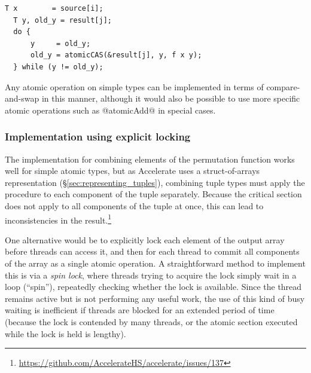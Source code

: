 \begin{lstlisting}[style=cuda]
  T x        = source[i];
  T y, old_y = result[j];
  do {
      y     = old_y;
      old_y = atomicCAS(&result[j], y, f x y);
  } while (y != old_y);
\end{lstlisting}
%
Any atomic operation on simple types can be implemented in terms of
compare-and-swap in this manner, although it would also be possible to use more
specific atomic operations such as @atomicAdd@\cuda{} in special cases.


\subsubsection{Implementation using explicit locking}

The implementation for combining elements of the permutation function works well
for simple atomic types, but as Accelerate uses a struct-of-arrays
representation (\S\ref{sec:representing_tuples}), combining tuple types must
apply the procedure to each component of the tuple separately. Because the
critical section does not apply to all components of the tuple at once, this can
lead to inconsistencies in the
result.\footnote{\url{https://github.com/AccelerateHS/accelerate/issues/137}}

One alternative would be to explicitly lock each element of the output array
before threads can access it, and then for each thread to commit all components
of the array as a single atomic operation. A straightforward method to implement
this is via a \emph{spin lock}, where threads trying to acquire the lock simply
wait in a loop (``spin''), repeatedly checking whether the lock is available.
Since the thread remains active but is not performing any useful work, the use
of this kind of busy waiting is inefficient if threads are blocked for an
extended period of time (because the lock is contended by many threads, or the
atomic section executed while the lock is held is lengthy).

